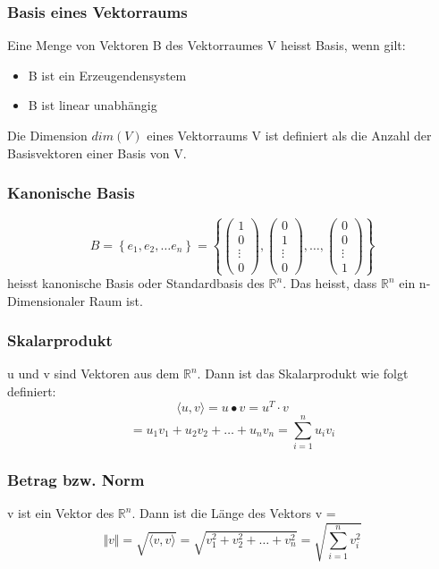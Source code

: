 \documentclass[10pt]{scrartcl}
\begin{document}
\begin{multicols}{2}
\subsubsection*{Basis eines Vektorraums}
Eine Menge von Vektoren B des Vektorraumes V heisst Basis, wenn gilt:
\begin{itemize}
\item B ist ein Erzeugendensystem
\item B ist linear unabhängig
\end{itemize}
Die Dimension $dim(V)$ eines Vektorraums V ist definiert als die Anzahl der Basisvektoren einer Basis von V.
\subsubsection*{Kanonische Basis}
\begin{equation}
B = \left\lbrace e_1, e_2, \dots e_n\right\rbrace = \left\lbrace \begin{pmatrix}
1 \\ 0 \\ \vdots \\ 0
\end{pmatrix}, \begin{pmatrix}
0 \\ 1 \\ \vdots \\ 0
\end{pmatrix}, \dots, \begin{pmatrix}
0 \\ 0 \\ \vdots \\ 1
\end{pmatrix} \right\rbrace 
\end{equation}
heisst kanonische Basis oder Standardbasis des $\mathbb{R}^n$. Das heisst, dass $\mathbb{R}^n$ ein n-Dimensionaler Raum ist.
\subsubsection*{Skalarprodukt}
u und v sind Vektoren aus dem $\mathbb{R}^n$.
Dann ist das Skalarprodukt wie folgt definiert:
\begin{equation}
\langle u,v\rangle = u \bullet v = u^T \cdot v
\end{equation}
\[= u_1v_1 + u_2v_2 + \dots + u_nv_n = \sum_{i=1}^n u_iv_i\]
\subsubsection*{Betrag bzw. Norm}
v ist ein Vektor des $\mathbb{R}^n$. Dann ist die Länge des Vektors v =
\begin{equation}
\Vert v \Vert = \sqrt{\langle v,v \rangle} = \sqrt{v_1^2 + v_2^2 + \dots + v_n^2} = \sqrt{\sum_{i=1}^n v_i^2}
\end{equation}

\end{multicols}
\end{document}
